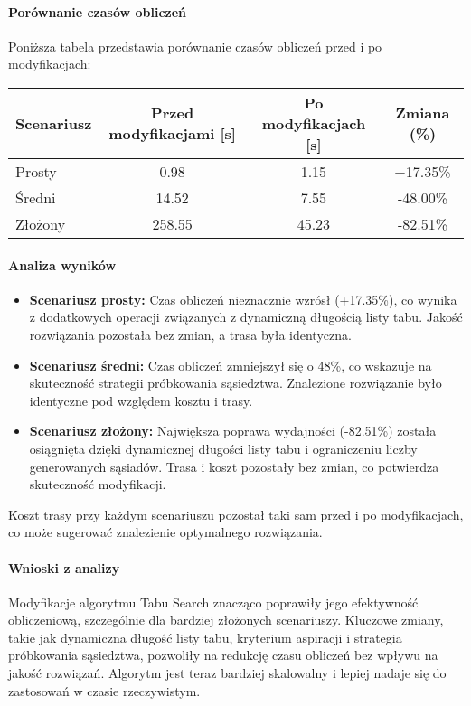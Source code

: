 \documentclass[12pt,a4paper]{article}
\begin{document}
\paragraph{Porównanie czasów obliczeń}
Poniższa tabela przedstawia porównanie czasów obliczeń przed i po modyfikacjach:

\begin{center}
\begin{tabular}{|l|c|c|c|}
\hline
\textbf{Scenariusz} & \textbf{Przed modyfikacjami [s]} & \textbf{Po modyfikacjach [s]} & \textbf{Zmiana (\%)} \\
\hline
Prosty & 0.98 & 1.15 & +17.35\% \\
Średni & 14.52 & 7.55 & -48.00\% \\
Złożony & 258.55 & 45.23 & -82.51\% \\
\hline
\end{tabular}
\end{center}

\paragraph{Analiza wyników}
\begin{itemize}
    \item \textbf{Scenariusz prosty:} Czas obliczeń nieznacznie wzrósł (+17.35\%), co wynika z dodatkowych operacji związanych z dynamiczną długością listy tabu. Jakość rozwiązania pozostała bez zmian, a trasa była identyczna.
    \item \textbf{Scenariusz średni:} Czas obliczeń zmniejszył się o 48\%, co wskazuje na skuteczność strategii próbkowania sąsiedztwa. Znalezione rozwiązanie było identyczne pod względem kosztu i trasy.
    \item \textbf{Scenariusz złożony:} Największa poprawa wydajności (-82.51\%) została osiągnięta dzięki dynamicznej długości listy tabu i ograniczeniu liczby generowanych sąsiadów. Trasa i koszt pozostały bez zmian, co potwierdza skuteczność modyfikacji.
\end{itemize}

Koszt trasy przy każdym scenariuszu pozostał taki sam przed i po modyfikacjach, co może sugerować znalezienie optymalnego rozwiązania.

\paragraph{Wnioski z analizy}
Modyfikacje algorytmu Tabu Search znacząco poprawiły jego efektywność obliczeniową, szczególnie dla bardziej złożonych scenariuszy. Kluczowe zmiany, takie jak dynamiczna długość listy tabu, kryterium aspiracji i strategia próbkowania sąsiedztwa, pozwoliły na redukcję czasu obliczeń bez wpływu na jakość rozwiązań. Algorytm jest teraz bardziej skalowalny i lepiej nadaje się do zastosowań w czasie rzeczywistym.
\end{document}
